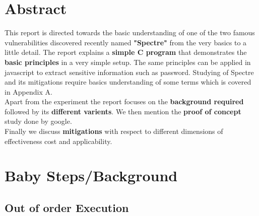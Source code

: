 \documentclass[12pt]{article}
\begin{document}

\tableofcontents
\pagebreak


\section{Abstract}
This report is directed towards the basic understanding of one of the two famous vulnerabilities discovered recently named \textbf{"Spectre"} from the very basics to a little detail. The report explains a \textbf{simple C program} that demonstrates the \textbf{basic principles} in a very simple setup. The same principles can be applied in javascript to extract sensitive information such as password. Studying of Spectre and its mitigations require basics understanding of some terms which is covered in Appendix A.\\

Apart from the experiment the report focuses on the \textbf{background required} followed by its \textbf{different varients}. We then mention the \textbf{proof of concept} study done by google. \\

Finally we discuss \textbf{mitigations} with respect to different dimensions of effectiveness cost and applicability.
%
%
\section{Baby Steps/Background}
\subsection{Out of order Execution}
\end{document}
